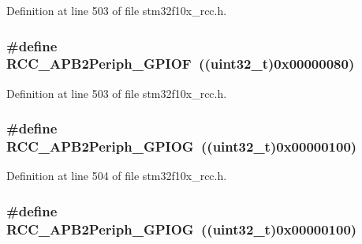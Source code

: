 Definition at line 503 of file stm32f10x\+\_\+rcc.\+h.

\subsubsection[{\texorpdfstring{R\+C\+C\+\_\+\+A\+P\+B2\+Periph\+\_\+\+G\+P\+I\+OF}{RCC_APB2Periph_GPIOF}}]{\setlength{\rightskip}{0pt plus 5cm}\#define R\+C\+C\+\_\+\+A\+P\+B2\+Periph\+\_\+\+G\+P\+I\+OF~(({\bf uint32\+\_\+t})0x00000080)}\hypertarget{group___a_p_b2__peripheral_ga2dbb1e1116b57621c585e1b52c894bda}{}\label{group___a_p_b2__peripheral_ga2dbb1e1116b57621c585e1b52c894bda}


Definition at line 503 of file stm32f10x\+\_\+rcc.\+h.

\subsubsection[{\texorpdfstring{R\+C\+C\+\_\+\+A\+P\+B2\+Periph\+\_\+\+G\+P\+I\+OG}{RCC_APB2Periph_GPIOG}}]{\setlength{\rightskip}{0pt plus 5cm}\#define R\+C\+C\+\_\+\+A\+P\+B2\+Periph\+\_\+\+G\+P\+I\+OG~(({\bf uint32\+\_\+t})0x00000100)}\hypertarget{group___a_p_b2__peripheral_gaba82756d2060b97c62eb555242361b2e}{}\label{group___a_p_b2__peripheral_gaba82756d2060b97c62eb555242361b2e}


Definition at line 504 of file stm32f10x\+\_\+rcc.\+h.

\subsubsection[{\texorpdfstring{R\+C\+C\+\_\+\+A\+P\+B2\+Periph\+\_\+\+G\+P\+I\+OG}{RCC_APB2Periph_GPIOG}}]{\setlength{\rightskip}{0pt plus 5cm}\#define R\+C\+C\+\_\+\+A\+P\+B2\+Periph\+\_\+\+G\+P\+I\+OG~(({\bf uint32\+\_\+t})0x00000100)}\hypertarget{group___a_p_b2__peripheral_gaba82756d2060b97c62eb555242361b2e}{}\label{group___a_p_b2__peripheral_gaba82756d2060b97c62eb555242361b2e}


